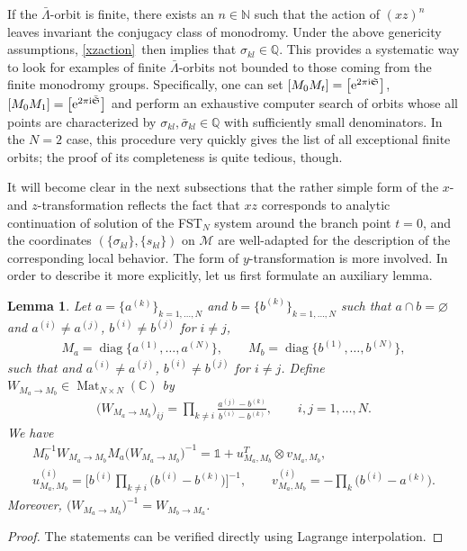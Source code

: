 \documentclass[pdftex]{sigma}
\newcommand\Cb{\mathbb{C}}
\numberwithin{equation}{section}
\newtheorem{Lemma}[Theorem]{Lemma}
\begin{document}
\begin{Remark}
If the $\bar \Lambda$-orbit is finite, there exists an $n\in\mathbb N$ such that the action of $(xz)^n$ leaves invariant the conjugacy class of monodromy. Under the above genericity assumptions, \eqref{xzaction}~then implies that $\sigma_{kl}\in \mathbb Q$. This provides a systematic way to look for examples of finite $\bar \Lambda$-orbits not bounded to those coming from the finite monodromy groups. Specifically, one can set $ [M_0M_t ]=\big[{\rm e}^{2\pi{\rm i}\mathfrak S}\big]$, $ [M_0M_1 ]=\big[{\rm e}^{2\pi{\rm i}\bar{\mathfrak S}}\big]$ and perform an exhaustive computer search of orbits whose all points are characterized by $\sigma_{kl},\bar{\sigma}_{kl}\in\mathbb Q$ with sufficiently small denominators. In the $N=2$ case, this procedure very quickly gives the list of all exceptional finite orbits; the proof of its completeness is quite tedious, though.
\end{Remark}

It will become clear in the next subsections that the rather simple form of the $x$- and $z$-transformation reflects the fact that $xz$ corresponds to analytic continuation of solution of the FST$_N$ system around the branch point $t=0$, and the coordinates $( \{\sigma_{kl} \}, \{s_{kl} \})$ on $\mathcal M$ are well-adapted for the description of the corresponding local behavior. The form of $y$-transformation is more involved. In order to describe it more explicitly, let us first formulate an auxiliary lemma.
\begin{Lemma}\label{lemrig}Let $a=\big\{a^{(k)}\big\}_{k=1,\ldots, N}$ and $b=\big\{b^{(k)}\big\}_{k=1,\ldots, N}$ such that $a\cap b=\varnothing$ and $a^{(i)}\ne a^{(j)}$, $b^{(i)}\ne b^{(j)}$ for $i\ne j$,
\begin{gather*}
M_{a}=\operatorname{diag}\big\{a^{(1)},\ldots,a^{(N)}\big\},\qquad M_{b}=\operatorname{diag}\big\{b^{(1)},\ldots,b^{(N)}\big\},
\end{gather*}
such that and $a^{(i)}\ne a^{(j)}$,
$b^{(i)}\ne b^{(j)}$ for $i\ne j$. Define $ W_{M_a\to M_b}\in\operatorname{Mat}_{N\times N}(\Cb)$ by
\begin{gather}\label{Wdef}
\big( W_{M_a\to M_b}\big)_{ij}=\prod_{k\ne i}\frac{a^{(j)}-b^{(k)}}{b^{(i)}-b^{(k)}}, \qquad i,j=1,\ldots,N.
\end{gather}
We have
\begin{gather}
M_{b}^{-1}W_{M_a\to M_b}M_{a} \bigl( W_{M_a\to M_b}\bigr)^{-1}=\mathds 1+u_{M_a,M_b}^T\otimes v_{M_a,M_b},\nonumber\\
u_{M_a,M_b}^{(i)}=\bigg[b^{(i)}\prod_{k\ne i}\big(b^{(i)}-b^{(k)}\big)\bigg]^{-1},\qquad v_{M_a,M_b}^{(i)}= -\prod_{k}\big(b^{(i)}-a^{(k)}\big).\label{Wab}
\end{gather}
Moreover, $\big( W_{M_a\to M_b}\big)^{-1}=W_{M_b\to M_a}$.
\end{Lemma}
\begin{proof} The statements can be verified directly using Lagrange interpolation. \end{proof}
\end{document}

